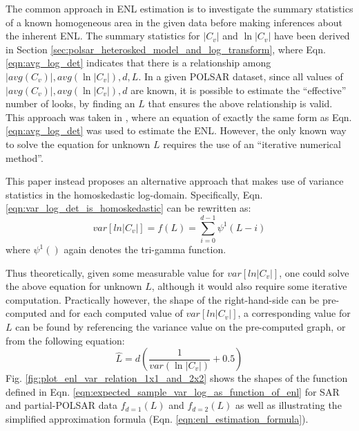 \documentclass[journal]{IEEEtran}
\begin{document}
The common approach in ENL estimation is to investigate the summary statistics of a known homogeneous area in the given data
  before making inferences about the inherent ENL.
The summary statistics for $|C_v|$ and $\ln|C_v|$ have been derived in Section \ref{sec:polsar_heterosked_model_and_log_transform},
  where Eqn. \ref{eqn:avg_log_det} indicates that there is a relationship among $|avg(C_v)|,avg(\ln|C_v|),d,L$.
In a given POLSAR dataset, since all values of $|avg(C_v)|,avg(\ln|C_v|),d$ are known,
  it is possible to estimate the ``effective'' number of looks, by finding an $L$ that ensures the above relationship is valid.
This approach was taken in \cite{Anfinsen_2009_TGRS_3795},
  where an equation of exactly the same form as Eqn.  \ref{eqn:avg_log_det} was used to estimate the ENL.
However, the only known way to solve the equation for unknown $L$ requires the use of an ``iterative numerical method''.

This paper instead proposes an alternative approach that makes use of variance statistics in the homoskedastic log-domain.
Specifically, Eqn. \ref{eqn:var_log_det_is_homoskedastic} can be rewritten as: 
\begin{equation}
  var \left[ ln|C_v| \right] = f(L) = \sum^{d-1}_{i=0} \psi^1(L-i)
  \label{eqn:expected_sample_var_log_as_function_of_enl}
\end{equation}
where $\psi^1()$ again denotes the tri-gamma function.

Thus theoretically, given some measurable value for $var  \left[ ln|C_v| \right]$, one could solve the above equation for unknown $L$,
  although it would also require some iterative computation.
Practically however, the shape of the right-hand-side can be pre-computed
  and for each computed value of $var  \left[ ln|C_v| \right]$, a corresponding value for $L$ can be found by referencing the variance value on the pre-computed graph, or from the following equation:%
  \begin{equation}
    \hat{L} = d \left( \frac{1}{var(\ln{|C_v|})} + 0.5 \right)
    \label{eqn:enl_estimation_formula}
  \end{equation}
Fig. \ref{fig:plot_enl_var_relation_1x1_and_2x2}
  shows the shapes of the function defined in Eqn. \ref{eqn:expected_sample_var_log_as_function_of_enl} for SAR and partial-POLSAR data $f_{d=1}(L)$ and $f_{d=2}(L)$
  as well as illustrating the simplified approximation formula (Eqn. \ref{eqn:enl_estimation_formula}).
  
\end{document}
